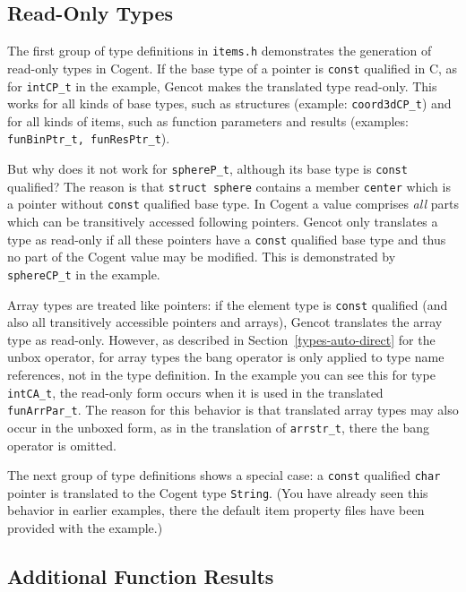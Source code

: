\documentclass[a4paper]{report}
\newcommand{\code}[1]{\textnormal{\texttt{#1}}}
\begin{document}
\subsection{Read-Only Types}
\label{types-dfltprops-readonly}

The first group of type definitions in \code{items.h} demonstrates the generation of read-only types in Cogent.
If the base type of a pointer is \code{const} qualified in C, as for \code{intCP\_t} in the example, Gencot makes
the translated type read-only. This works for all kinds of base types, such as structures (example: \code{coord3dCP\_t})
and for all kinds of items, such as function parameters and results (examples: \code{funBinPtr\_t, funResPtr\_t}).

But why does it not work for \code{sphereP\_t}, although its base type is \code{const} qualified? The reason is that 
\code{struct sphere} contains a member \code{center} which is a pointer without \code{const} qualified base
type. In Cogent a value comprises \textit{all} parts which can be transitively accessed following pointers. Gencot
only translates a type as read-only if all these pointers have a \code{const} qualified base type and thus no part 
of the Cogent value may be modified. This is demonstrated by \code{sphereCP\_t} in the example.

Array types are treated like pointers: if the element type is \code{const} qualified (and also all transitively 
accessible pointers and arrays), Gencot translates the array type as read-only. However, as described in 
Section~\ref{types-auto-direct} for the unbox operator, for array types the bang operator is only applied to type 
name references, not in the type definition. In the example you can see this for type \code{intCA\_t}, the read-only
form occurs when it is used in the translated \code{funArrPar\_t}. The reason for this behavior is that translated 
array types may also occur in the unboxed form, as in the translation of \code{arrstr\_t}, there the bang operator
is omitted.

The next group of type definitions shows a special case: a \code{const} qualified \code{char} pointer is translated 
to the Cogent type \code{String}. (You have already seen this behavior in earlier examples, there the default item 
property files have been provided with the example.)

\subsection{Additional Function Results}
\label{types-dfltprops-addresult}
\end{document}
